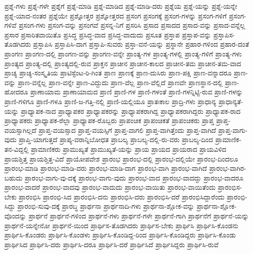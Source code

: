 {ಪ್ರಶ್ನೆ-ಗಳು
ಪ್ರಶ್ನೆ-ಗಳೇ
ಪ್ರಶ್ನೆಗೆ
ಪ್ರಶ್ನೆ-ಮಾಡಿ
ಪ್ರಶ್ನೆ-ಮಾಡಿದ
ಪ್ರಶ್ನೆ-ಮಾಡಿ-ದರು
ಪ್ರಶ್ನೆಯ
ಪ್ರಶ್ನೆ-ಯನ್ನು
ಪ್ರಶ್ನೆ-ಯನ್ನೇ
ಪ್ರಶ್ನೆ-ಯಾದ-ನಂತರ
ಪ್ರಶ್ನೆಯೇ
ಪ್ರಶ್ನೋತ್ತರ
ಪ್ರಶ್ನೋತ್ತರದ
ಪ್ರಸಂಗ
ಪ್ರಸಂಗಕ್ಕೆ
ಪ್ರಸಂಗ-ಗಳನ್ನು
ಪ್ರಸಂಗ-ಗಳಿಗೆ
ಪ್ರಸಂಗ-ಗಳಿವೆ
ಪ್ರಸಂಗ-ಗಳು
ಪ್ರಸಂಗ-ವನ್ನು
ಪ್ರಸಂಗವೆ
ಪ್ರಸನ್ನ-ನಿಗೆ
ಪ್ರಸರಿಸಿ
ಪ್ರಸಾದ
ಪ್ರಸಾದದ
ಪ್ರಸಾದ-ವನ್ನು
ಪ್ರಸಾದ-ವನ್ನೆಲ್ಲ
ಪ್ರಸಾರ
ಪ್ರಸಾರಿತವಾಯಿತೊ
ಪ್ರಸಿದ್ಧ
ಪ್ರಸಿದ್ಧ-ವಾದ
ಪ್ರಸಿದ್ಧ-ವಾದುದು
ಪ್ರಸೂತ
ಪ್ರಸ್ತಾಪ
ಪ್ರಸ್ತಾಪ-ವನ್ನು
ಪ್ರಸ್ತಾಪಿಸ-ತೊಡಗಿದರು
ಪ್ರಸ್ತಾಪಿಸಿ
ಪ್ರಸ್ತಾಪಿಸಿ-ದಾಗ
ಪ್ರಸ್ತಾಪಿ-ಸುವರು
ಪ್ರಸ್ತಾ-ವನೆ-ಯನ್ನು
ಪ್ರಸ್ಥಾನೇ
ಪ್ರಹಾರ-ಗಳಿಂದ
ಪ್ರಹಾರ-ದಂತೆ
ಪ್ರಾಂಗಣ
ಪ್ರಾಂಗಣ-ದಲ್ಲಿ
ಪ್ರಾಂಗಣ-ವನ್ನು
ಪ್ರಾಂಗಣ-ವನ್ನೇ
ಪ್ರಾಂತ್ಯ-ಗಳ
ಪ್ರಾಂತ್ಯ-ಗಳಲ್ಲಿ
ಪ್ರಾಂತ್ಯ-ಗಳಿಗೆ
ಪ್ರಾಂತ್ಯ-ಗಳು
ಪ್ರಾಂತ್ಯದ
ಪ್ರಾಂತ್ಯ-ದಲ್ಲಿ
ಪ್ರಾಂತ್ಯದಲ್ಲಿ-ರುವ
ಪ್ರಾಕ್ತನ
ಪ್ರಾಚೀನ
ಪ್ರಾಚೀನ-ಕಾಲದ
ಪ್ರಾಚೀನ-ತಮ
ಪ್ರಾಚೀನ-ತಮ-ವಾದ
ಪ್ರಾಚ್ಯ
ಪ್ರಾಚ್ಯ-ಸಂಸ್ಕೃತಿಯ
ಪ್ರಾಟಿಸ್ಟೆಂಟ-ರಿ-ಗಿಂತ
ಪ್ರಾಣ
ಪ್ರಾಣಕ್ಕೆ
ಪ್ರಾಣ-ದುಸಿರು
ಪ್ರಾಣ-ಪಕ್ಷಿ
ಪ್ರಾಣ-ವನ್ನಾದರೂ
ಪ್ರಾಣ-ವನ್ನು
ಪ್ರಾಣ-ವನ್ನೆಲ್ಲ
ಪ್ರಾಣ-ವನ್ನೇ
ಪ್ರಾಣ-ವಿದ್ದುದು
ಪ್ರಾಣ-ವೆಲ್ಲ
ಪ್ರಾಣ-ವೆಲ್ಲಿದೆ
ಪ್ರಾಣವೇ
ಪ್ರಾಣಸ್ಥಾನ-ದಲ್ಲಿ
ಪ್ರಾಣ-ಹೋದರೂ
ಪ್ರಾಣಾಯಾಮ
ಪ್ರಾಣಾಯಾಮದ
ಪ್ರಾಣಿ
ಪ್ರಾಣಿ-ಗಳ
ಪ್ರಾಣಿ-ಗಳಂತೆ
ಪ್ರಾಣಿ-ಗಳನ್ನಿಟ್ಟಿ-ರುವ
ಪ್ರಾಣಿ-ಗಳನ್ನು
ಪ್ರಾಣಿ-ಗಳಿಗೂ
ಪ್ರಾಣಿ-ಗಳೂ
ಪ್ರಾಣಿ-ಜ-ಗತ್ತಿ-ನಲ್ಲಿ
ಪ್ರಾಣಿ-ಯಲ್ಲಿಯೂ
ಪ್ರಾತಃಕಾಲ
ಪ್ರಾದ್ರಿ-ಗಳು
ಪ್ರಾಧಾನ್ಯ
ಪ್ರಾಧಾನ್ಯತೆ-ಯನ್ನು
ಪ್ರಾಧ್ಯಾಪಕ-ನಾದ
ಪ್ರಾಧ್ಯಾಪಕರ
ಪ್ರಾಧ್ಯಾಪಕರನ್ನು
ಪ್ರಾಧ್ಯಾಪಕರಾಗಿದ್ದ
ಪ್ರಾಧ್ಯಾಪಕರಾಗಿದ್ದರು
ಪ್ರಾಧ್ಯಾಪಕ-ರಾದ
ಪ್ರಾಧ್ಯಾಪಕರು
ಪ್ರಾಧ್ಯಾಪಕ-ರೆಲ್ಲಾ
ಪ್ರಾಧ್ಯಾಪಕ-ರೊಬ್ಬರು
ಪ್ರಾಪಂಚಿಕ
ಪ್ರಾಪಂಚಿಕತೆ
ಪ್ರಾಪಂಚಿಕರು
ಪ್ರಾಪ್ತ
ಪ್ರಾಪ್ತ-ವಯಸ್ಸಾಗಿಲ್ಲದೆ
ಪ್ರಾಪ್ತ-ವಯಸ್ಸಾದ
ಪ್ರಾಪ್ತ-ವಯಸ್ಸಿಗೆ
ಪ್ರಾಪ್ತ-ವಾಗಲಿ
ಪ್ರಾಪ್ತ-ವಾಗಿತ್ತೆಂದು
ಪ್ರಾಪ್ತ-ವಾಗಿದೆ
ಪ್ರಾಪ್ತ-ವಾಗು-ವುದು
ಪ್ರಾಪ್ತಿ-ಯಾಗುತ್ತದೆ
ಪ್ರಾಪ್ಯ-ವರಾನ್ನಿಬೋಧತ
ಪ್ರಾಬಲ್ಯ
ಪ್ರಾಬಲ್ಯ-ದಲ್ಲಿ-ರು-ವರು
ಪ್ರಾಬಲ್ಯ-ದಿಂದ
ಪ್ರಾಮಾಣಿಕ-ತನ-ವಿದ್ದಲ್ಲಿ
ಪ್ರಾಮಾಣಿಕರು
ಪ್ರಾಮುಖ್ಯತೆ
ಪ್ರಾಮುಖ್ಯತೆ-ಯನ್ನು
ಪ್ರಾಯ
ಪ್ರಾಯದ
ಪ್ರಾಯರಾದ
ಪ್ರಾಯವಿಳಿದ
ಪ್ರಾಯಶ್ಚಿತ್ತ
ಪ್ರಾಯಶ್ಚಿತ್ತ-ವಿದೆ
ಪ್ರಾಯೋಪವೇಶ
ಪ್ರಾರಂಭ
ಪ್ರಾರಂಭ-ದಲ್ಲಿ
ಪ್ರಾರಂಭ-ದಲ್ಲಿಯೇ
ಪ್ರಾರಂಭ-ದಿಂದಲೂ
ಪ್ರಾರಂಭ-ಮಾಡಿ
ಪ್ರಾರಂಭ-ಮಾಡಿ-ದರು
ಪ್ರಾರಂಭ-ಮಾಡಿ-ದಾಗ
ಪ್ರಾರಂಭ-ವಾಗಿ
ಪ್ರಾರಂಭ-ವಾಗಿದೆ
ಪ್ರಾರಂಭ-ವಾಗಿರ-ಬಹುದು
ಪ್ರಾರಂಭ-ವಾಗು-ವು-ದಕ್ಕೆ
ಪ್ರಾರಂಭ-ವಾಗು-ವುದು
ಪ್ರಾರಂಭ-ವಾದ
ಪ್ರಾರಂಭ-ವಾದದ್ದು
ಪ್ರಾರಂಭ-ವಾದರೂ
ಪ್ರಾರಂಭ-ವಾದರೆ
ಪ್ರಾರಂಭ-ವಾದವು
ಪ್ರಾರಂಭ-ವಾದುದು
ಪ್ರಾರಂಭ-ವಾಯಿತು
ಪ್ರಾರಂಭ-ವಾಯಿತೆಂದು
ಪ್ರಾರಂಭಿಸ-ಬೇಕು
ಪ್ರಾರಂಭಿಸಿ
ಪ್ರಾರಂಭಿ-ಸಿದ
ಪ್ರಾರಂಭಿಸಿ-ದನು
ಪ್ರಾರಂಭಿಸಿ-ದರು
ಪ್ರಾರಂಭಿಸಿ-ದರೆ
ಪ್ರಾರಂಭಿಸಿದ್ದಾರೆಂದು
ಪ್ರಾರಂಭಿ-ಸಿದ್ದು
ಪ್ರಾರಂಭಿ-ಸುವು-ದಕ್ಕೆ
ಪ್ರಾರಬ್ಧ
ಪ್ರಾರ್ಥನಾ
ಪ್ರಾರ್ಥನಾದಿ-ಗಳು
ಪ್ರಾರ್ಥನಾ-ಶ್ಲೋಕ-ವನ್ನು
ಪ್ರಾರ್ಥನಾ-ಶ್ಲೋಕ-ವೊಂದನ್ನು
ಪ್ರಾರ್ಥನೆ
ಪ್ರಾರ್ಥನೆ-ಗಳಿಂದ
ಪ್ರಾರ್ಥನೆ-ಗಳು
ಪ್ರಾರ್ಥನೆ-ಗಳೇ
ಪ್ರಾರ್ಥನೆ-ಗಾಗಿ
ಪ್ರಾರ್ಥನೆಗೆ
ಪ್ರಾರ್ಥನೆ-ಯನ್ನು
ಪ್ರಾರ್ಥನೆ-ಯನ್ನೇನೋ
ಪ್ರಾರ್ಥನೆ-ಯಿಂದ
ಪ್ರಾರ್ಥಿಸ-ತೊಡಗಿದರು
ಪ್ರಾರ್ಥಿಸ-ಬೇಕು
ಪ್ರಾರ್ಥಿಸಿ
ಪ್ರಾರ್ಥಿಸಿ-ಕೊಂಡನು
ಪ್ರಾರ್ಥಿಸಿ-ಕೊಂಡರು
ಪ್ರಾರ್ಥಿಸಿ-ಕೊಂಡಳು
ಪ್ರಾರ್ಥಿಸಿ-ಕೊಂಡಿದ್ದ-ರಿಂದ
ಪ್ರಾರ್ಥಿಸಿ-ಕೊಂಡಿದ್ದರು
ಪ್ರಾರ್ಥಿಸಿ-ಕೊಂಡು
ಪ್ರಾರ್ಥಿಸಿದ
ಪ್ರಾರ್ಥಿಸಿ-ದರು
ಪ್ರಾರ್ಥಿಸಿ-ದರೂ
ಪ್ರಾರ್ಥಿಸಿ-ದರೆ
ಪ್ರಾರ್ಥಿಸಿದೆ
ಪ್ರಾರ್ಥಿಸಿದ್ದರು
ಪ್ರಾರ್ಥಿಸಿ-ರುವೆ
}
